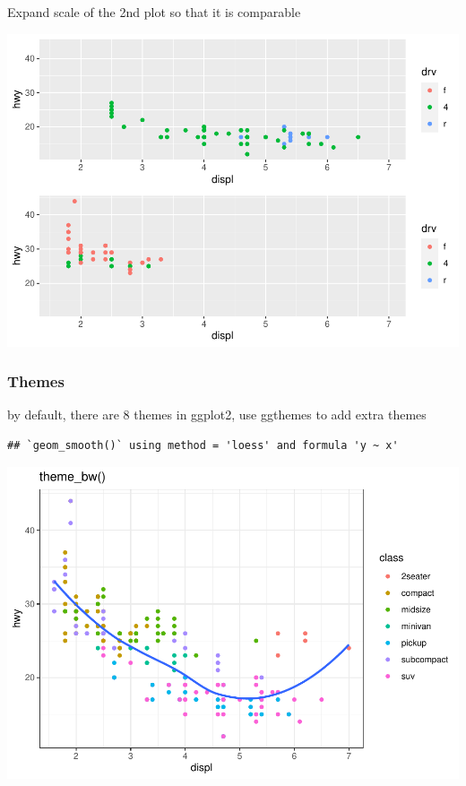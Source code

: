 \documentclass[
]{article}
\begin{document}
Expand scale of the 2nd plot so that it is comparable

\includegraphics{rmarkdown_tutorial_files/figure-latex/unnamed-chunk-31-1.pdf}

\hypertarget{themes}{%
\subsubsection{Themes}\label{themes}}

by default, there are 8 themes in ggplot2, use ggthemes to add extra
themes

\begin{verbatim}
## `geom_smooth()` using method = 'loess' and formula 'y ~ x'
\end{verbatim}

\includegraphics{rmarkdown_tutorial_files/figure-latex/unnamed-chunk-32-1.pdf}
\end{document}
